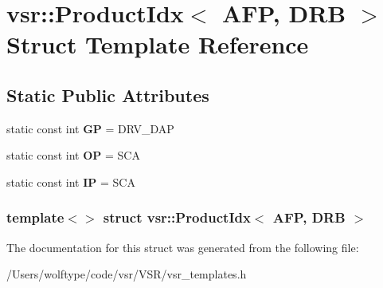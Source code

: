 \hypertarget{structvsr_1_1_product_idx_3_01_a_f_p_00_01_d_r_b_01_4}{\section{vsr\-:\-:Product\-Idx$<$ A\-F\-P, D\-R\-B $>$ Struct Template Reference}
\label{structvsr_1_1_product_idx_3_01_a_f_p_00_01_d_r_b_01_4}
}
\subsection*{Static Public Attributes}
\begin{DoxyCompactItemize}
\item 
\hypertarget{structvsr_1_1_product_idx_3_01_a_f_p_00_01_d_r_b_01_4_a9387735099e91d1ef45ce610b639c926}{static const int {\bfseries G\-P} = D\-R\-V\-\_\-\-D\-A\-P}\label{structvsr_1_1_product_idx_3_01_a_f_p_00_01_d_r_b_01_4_a9387735099e91d1ef45ce610b639c926}

\item 
\hypertarget{structvsr_1_1_product_idx_3_01_a_f_p_00_01_d_r_b_01_4_ad19133d29bbb7cc0214574265c8ec761}{static const int {\bfseries O\-P} = S\-C\-A}\label{structvsr_1_1_product_idx_3_01_a_f_p_00_01_d_r_b_01_4_ad19133d29bbb7cc0214574265c8ec761}

\item 
\hypertarget{structvsr_1_1_product_idx_3_01_a_f_p_00_01_d_r_b_01_4_afa2ffe7520ad3a86217895e56f9a9b18}{static const int {\bfseries I\-P} = S\-C\-A}\label{structvsr_1_1_product_idx_3_01_a_f_p_00_01_d_r_b_01_4_afa2ffe7520ad3a86217895e56f9a9b18}

\end{DoxyCompactItemize}
\subsubsection*{template$<$$>$ struct vsr\-::\-Product\-Idx$<$ A\-F\-P, D\-R\-B $>$}



The documentation for this struct was generated from the following file\-:\begin{DoxyCompactItemize}
\item 
/\-Users/wolftype/code/vsr/\-V\-S\-R/vsr\-\_\-templates.\-h\end{DoxyCompactItemize}
